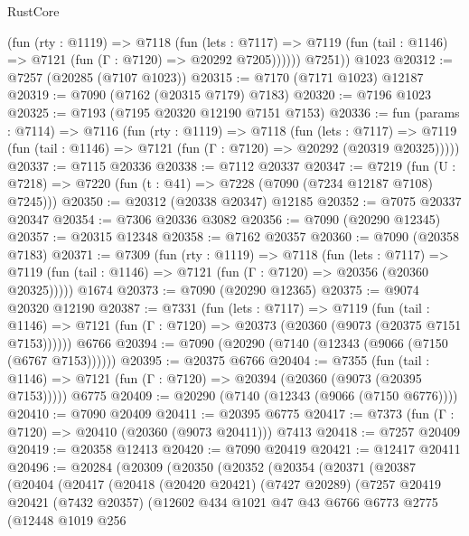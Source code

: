 \begin{lexlean}{RustCore}
\begin{coremodule}
            (fun (rty : @1119) =>
            @7118
              (fun (lets : @7117) =>
              @7119 (fun (tail : @1146) => @7121 (fun (Γ : @7120) => @20292 @7205))))))
        @7251))
    @1023
@20312 := @7257 (@20285 (@7107 @1023))
@20315 := @7170 (@7171 @1023) @12187
@20319 := @7090 (@7162 (@20315 @7179) @7183)
@20320 := @7196 @1023
@20325 := @7193 (@7195 @20320 @12190 @7151 @7153)
@20336 := fun (params : @7114) =>
  @7116
    (fun (rty : @1119) =>
    @7118
      (fun (lets : @7117) =>
      @7119 (fun (tail : @1146) => @7121 (fun (Γ : @7120) => @20292 (@20319 @20325)))))
@20337 := @7115 @20336
@20338 := @7112 @20337
@20347 := @7219
    (fun (U : @7218) => @7220 (fun (t : @41) => @7228 (@7090 (@7234 @12187 @7108) @7245)))
@20350 := @20312 (@20338 @20347) @12185
@20352 := @7075 @20337 @20347
@20354 := @7306 @20336 @3082
@20356 := @7090 (@20290 @12345)
@20357 := @20315 @12348
@20358 := @7162 @20357
@20360 := @7090 (@20358 @7183)
@20371 := @7309
    (fun (rty : @1119) =>
    @7118
      (fun (lets : @7117) =>
      @7119 (fun (tail : @1146) => @7121 (fun (Γ : @7120) => @20356 (@20360 @20325)))))
    @1674
@20373 := @7090 (@20290 @12365)
@20375 := @9074 @20320 @12190
@20387 := @7331
    (fun (lets : @7117) =>
    @7119
      (fun (tail : @1146) =>
      @7121 (fun (Γ : @7120) => @20373 (@20360 (@9073 (@20375 @7151 @7153))))))
    @6766
@20394 := @7090 (@20290 (@7140 (@12343 (@9066 (@7150 (@6767 @7153))))))
@20395 := @20375 @6766
@20404 := @7355
    (fun (tail : @1146) => @7121 (fun (Γ : @7120) => @20394 (@20360 (@9073 (@20395 @7153)))))
    @6775
@20409 := @20290 (@7140 (@12343 (@9066 (@7150 @6776))))
@20410 := @7090 @20409
@20411 := @20395 @6775
@20417 := @7373 (fun (Γ : @7120) => @20410 (@20360 (@9073 @20411))) @7413
@20418 := @7257 @20409
@20419 := @20358 @12413
@20420 := @7090 @20419
@20421 := @12417 @20411
@20496 := @20284
    (@20309
      (@20350
        (@20352
          (@20354
            (@20371
              (@20387
                (@20404
                  (@20417
                    (@20418
                      (@20420 @20421)
                      (@7427 @20289)
                      (@7257
                        @20419
                        @20421
                        (@7432 @20357)
                        (@12602
                          @434
                          @1021
                          @47
                          @43
                          @6766
                          @6773
                          @2775
                          (@12448
                            @1019
                            @256

\end{coremodule}
\end{lexlean}
